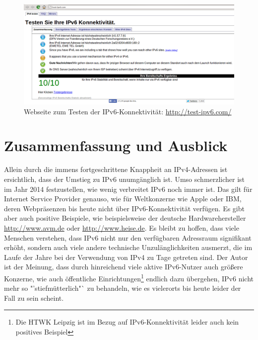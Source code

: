 \documentclass[a4paper,12pt]{scrartcl}
\begin{document}
\begin{figure}[htb]
\begin{center}
 \includegraphics[width=1\hsize]{./images/testipv6.png}
 \end{center}
\caption[Webseite zum Testen der IPv6-Konnektivit\"at: \url{http://test-ipv6.com/}]{\label{testipv6}Webseite zum Testen der IPv6-Konnektivit\"at: \url{http://test-ipv6.com/}}
\end{figure}

\section{Zusammenfassung und Ausblick}
\label{sec:5}
Allein durch die immens fortgeschrittene Knappheit an IPv4-Adressen ist ersichtlich, dass der Umstieg zu IPv6 unumg\"anglich ist. Umso schmerzlicher ist im Jahr 2014 festzustellen, wie wenig verbreitet IPv6 noch immer ist. Das gilt f\"ur Internet Service Provider genauso, wie f\"ur Weltkonzerne wie Apple oder IBM, deren Webpräsenzen bis heute nicht über IPv6-Konnektivit\"at verf\"ugen. Es gibt aber auch positive Beispiele, wie beispielsweise der deutsche Hardwarehersteller \url{http://www.avm.de} oder \url{http://www.heise.de}. Es bleibt zu hoffen, dass viele Menschen verstehen, dass IPv6 nicht nur den verf\"ugbaren Adressraum signifikant erh\"oht, sondern auch viele andere technische Unzul\"anglichkeiten ausmerzt, die im Laufe der Jahre bei der Verwendung von IPv4 zu Tage getreten sind. Der Autor ist der Meinung, dass durch hinreichend viele aktive IPv6-Nutzer auch gr\"o{\ss}ere Konzerne, wie auch \"offentliche Einrichtungen\footnote{Die HTWK Leipzig ist im Bezug auf IPv6-Konnektivit\"at leider auch kein positives Beispiel} endlich dazu \"ubergehen, IPv6 nicht mehr so "'stiefm\"utterlich"` zu behandeln, wie es vielerorts bis heute leider der Fall zu sein scheint. 


\clearpage
\end{document}
